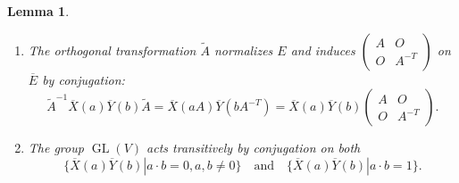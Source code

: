 \documentclass[a4paper]{article}
\DeclareMathOperator{\GL}{GL}
\newtheorem{lemma}{Lemma}
\begin{document}
  \begin{lemma}
    \begin{enumerate}
      \item The orthogonal transformation $\tilde A$ 
        normalizes $E$ and induces $\begin{pmatrix} A & O \\
        O & A^{-T}\end{pmatrix}$ on $\overline{E}$ by
        conjugation:
        \[
          \tilde A^{-1}\overline{X}(a)\overline{Y}(b)\tilde
          A
          = \overline{X}(aA)\overline{Y}(bA^{-T})
          = \overline{X}(a)\overline{Y}(b) 
          \begin{pmatrix} A & O \\ O & A^{-T} \end{pmatrix}.
        \] 
      \item The group $\GL(V)$ acts transitively by
        conjugation on both
         \begin{equation}
          \{\overline{X}(a)\overline{Y}(b) | a \cdot b = 0,
          a, b \neq 0\}
          \quad \text{and} \quad
          \{\overline{X}(a)\overline{Y}(b) | a \cdot b =
          1\}.
        \end{equation}
    \end{enumerate}
  \end{lemma}
\end{document}
